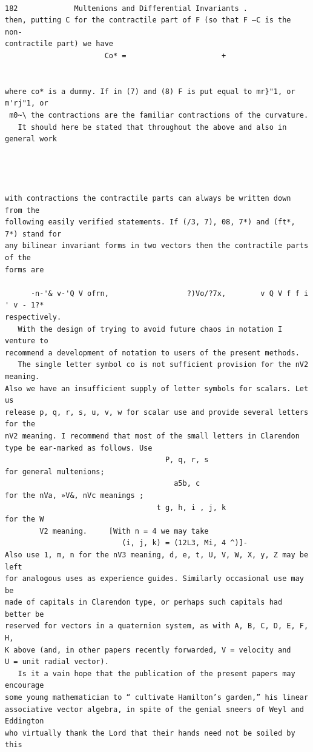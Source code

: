 \documentclass[10pt]{article}
\begin{document}
\clearpage
\begin{verbatim}

182             Multenions and Differential Invariants .
then, putting C for the contractile part of F (so that F —C is the non-
contractile part) we have
                       Co* =                      +


where co* is a dummy. If in (7) and (8) F is put equal to mr}"1, or m'rj"1, or
 m0~\ the contractions are the familiar contractions of the curvature.
   It should here be stated that throughout the above and also in general work




with contractions the contractile parts can always be written down from the
following easily verified statements. If (/3, 7), 08, 7*) and (ft*, 7*) stand for
any bilinear invariant forms in two vectors then the contractile parts of the
forms are

      -n-'& v-'Q V ofrn,                  ?)Vo/?7x,        v Q V f f i ' v - 1?*
respectively.
   With the design of trying to avoid future chaos in notation I venture to
recommend a development of notation to users of the present methods.
   The single letter symbol co is not sufficient provision for the nV2 meaning.
Also we have an insufficient supply of letter symbols for scalars. Let us
release p, q, r, s, u, v, w for scalar use and provide several letters for the
nV2 meaning. I recommend that most of the small letters in Clarendon
type be ear-marked as follows. Use
                                     P, q, r, s
for general multenions;
                                       a5b, c
for the nVa, »V&, nVc meanings ;
                                   t g, h, i , j, k
for the W
        V2 meaning.     [With n = 4 we may take
                           (i, j, k) = (12L3, Mi, 4 ^)]-
Also use 1, m, n for the nV3 meaning, d, e, t, U, V, W, X, y, Z may be left
for analogous uses as experience guides. Similarly occasional use may be
made of capitals in Clarendon type, or perhaps such capitals had better be
reserved for vectors in a quaternion system, as with A, B, C, D, E, F, H,
K above (and, in other papers recently forwarded, V = velocity and
U = unit radial vector).
   Is it a vain hope that the publication of the present papers may encourage
some young mathematician to “ cultivate Hamilton’s garden,” his linear
associative vector algebra, in spite of the genial sneers of Weyl and Eddington
who virtually thank the Lord that their hands need not be soiled by this


\end{verbatim}
\end{document}

